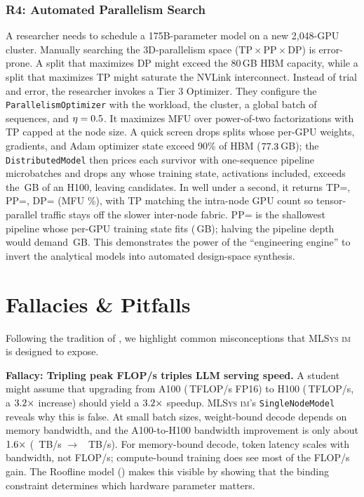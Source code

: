 \documentclass[10pt,twocolumn]{article}
\newcommand{\mlsysim}{\mbox{\textsc{MLSys}\,\textperiodcentered\,\textsc{im}}\xspace}
\begin{document}
\subsubsection{R4: Automated Parallelism Search}
A researcher needs to schedule a 175B-parameter model on a new 2{,}048-GPU cluster. Manually searching the 3D-parallelism space ($\text{TP} \times \text{PP} \times \text{DP}$) is error-prone. A split that maximizes DP might exceed the 80\,GB HBM capacity, while a split that maximizes TP might saturate the NVLink interconnect. Instead of trial and error, the researcher invokes a Tier 3 Optimizer. They configure the \texttt{ParallelismOptimizer} with the workload, the cluster, a global batch of \CaseRFourBatch{} sequences, and $\eta = 0.5$. It maximizes MFU over power-of-two factorizations with TP capped at the node size. A quick screen drops splits whose per-GPU weights, gradients, and Adam optimizer state exceed 90\% of HBM ($77.3$\,GB); the \texttt{DistributedModel} then prices each survivor with one-sequence pipeline microbatches and drops any whose training state, activations included, exceeds the \CaseRFourCapacityGB\,GB of an H100, leaving \CaseRFourCandidates{} candidates. In well under a second, it returns TP=\CaseRFourTp, PP=\CaseRFourPp, DP=\CaseRFourDp{} (MFU \CaseRFourBestMfuPct\%), with TP matching the intra-node GPU count so tensor-parallel traffic stays off the slower inter-node fabric. PP=\CaseRFourMinPp{} is the shallowest pipeline whose per-GPU training state fits (\CaseRFourStateAtMinPpGB\,GB); halving the pipeline depth would demand \CaseRFourStateBelowMinPpGB\,GB. This demonstrates the power of the ``engineering engine'' to invert the analytical models into automated design-space synthesis.

\section{Fallacies \& Pitfalls}
\label{sec:fallacies}

Following the tradition of \citet{hennessy2024architecture}, we highlight common misconceptions that \mlsysim is designed to expose.

\textbf{Fallacy: Tripling peak FLOP/s triples LLM serving speed.}
A student might assume that upgrading from A100 (\RegAhPeakTflops\,TFLOP/s FP16) to H100 (\RegHhPeakTflops\,TFLOP/s, a $3.2{\times}$ increase) should yield a $3.2{\times}$ speedup. \mlsysim's \texttt{SingleNodeModel} reveals why this is false. At small batch sizes, weight-bound decode depends on memory bandwidth, and the A100-to-H100 bandwidth improvement is only about $1.6{\times}$ (\RegAhBandwidthTBs~TB/s $\to$ \RegHhBandwidthTBs~TB/s). For memory-bound decode, token latency scales with bandwidth, not FLOP/s; compute-bound training does see most of the FLOP/s gain. The Roofline model () makes this visible by showing that the binding constraint determines which hardware parameter matters.
\end{document}
